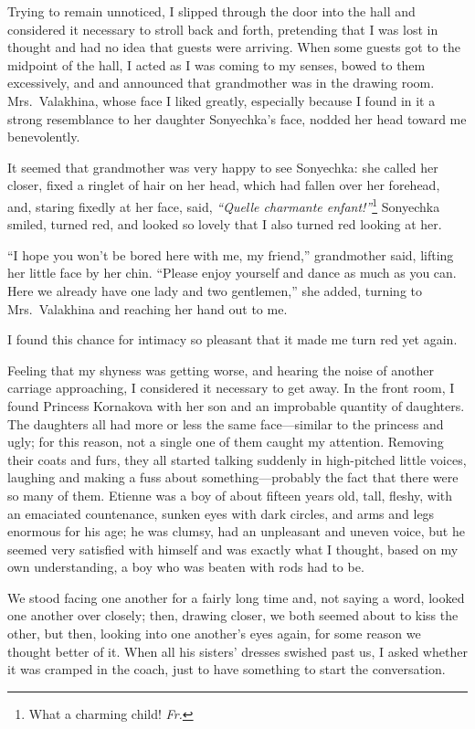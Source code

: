 Trying to remain unnoticed, I slipped through the door into the hall and considered it necessary to stroll back and forth, pretending that I was lost in thought and had no idea that guests were arriving. When some guests got to the midpoint of the hall, I acted as I was coming to my senses, bowed to them excessively, and and announced that grandmother was in the drawing room. Mrs.~Valakhina, whose face I liked greatly, especially because I found in it a strong resemblance to her daughter Sonyechka's face, nodded her head toward me benevolently.

It seemed that grandmother was very happy to see Sonyechka: she called her closer, fixed a ringlet of hair on her head, which had fallen over her forehead, and, staring fixedly at her face, said, \textit{``Quelle charmante enfant!''}\footnote{What a charming child! \textit{Fr.}} Sonyechka smiled, turned red, and looked so lovely that I also turned red looking at her.

``I hope you won't be bored here with me, my friend,'' grandmother said, lifting her little face by her chin. ``Please enjoy yourself and dance as much as you can. Here we already have one lady and two gentlemen,'' she added, turning to Mrs.~Valakhina and reaching her hand out to me.

I found this chance for intimacy so pleasant that it made me turn red yet again.

Feeling that my shyness was getting worse, and hearing the noise of another carriage approaching, I considered it necessary to get away. In the front room, I found Princess Kornakova with her son and an improbable quantity of daughters. The daughters all had more or less the same face---similar to the princess and ugly; for this reason, not a single one of them caught my attention. Removing their coats and furs, they all started talking suddenly in high-pitched little voices, laughing and making a fuss about something---probably the fact that there were so many of them. Etienne was a boy of about fifteen years old, tall, fleshy, with an emaciated countenance, sunken eyes with dark circles, and arms and legs enormous for his age; he was clumsy, had an unpleasant and uneven voice, but he seemed very satisfied with himself and was exactly what I thought, based on my own understanding, a boy who was beaten with rods had to be.

We stood facing one another for a fairly long time and, not saying a word, looked one another over closely; then, drawing closer, we both seemed about to kiss the other, but then, looking into one another's eyes again, for some reason we thought better of it. When all his sisters' dresses swished past us, I asked whether it was cramped in the coach, just to have something to start the conversation.


